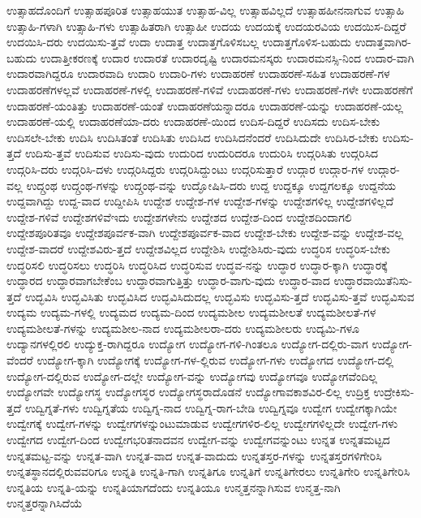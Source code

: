 {ಉತ್ಸಾಹದೊಂದಿಗೆ
ಉತ್ಸಾಹಪೂರಿತ
ಉತ್ಸಾಹಯುತ
ಉತ್ಸಾಹ-ವಿಲ್ಲ
ಉತ್ಸಾಹವಿಲ್ಲದೆ
ಉತ್ಸಾಹಹೀನನಾಗುವ
ಉತ್ಸಾಹಿ
ಉತ್ಸಾಹಿ-ಗಳಾಗಿ
ಉತ್ಸಾಹಿ-ಗಳು
ಉತ್ಸಾಹಿತರಾಗಿ
ಉತ್ಸಾಹೀ
ಉದಯ
ಉದಯಕ್ಕೆ
ಉದಯರವಿಯ
ಉದಯಿಸ-ದಿದ್ದರೆ
ಉದಯಿಸಿ-ದರು
ಉದಯಿಸು-ತ್ತವೆ
ಉದಾ
ಉದಾತ್ತ
ಉದಾತ್ತಗೊಳಿಸಬಲ್ಲ
ಉದಾತ್ತಗೊಳಿಸ-ಬಹುದು
ಉದಾತ್ತವಾಗಿರ-ಬಹುದು
ಉದಾತ್ತೀಕರಣಕ್ಕೆ
ಉದಾರ
ಉದಾರತೆ
ಉದಾರದೃಷ್ಟಿ
ಉದಾರಮನಸ್ಕರು
ಉದಾರಮನಸ್ಸಿ-ನಿಂದ
ಉದಾರ-ವಾಗಿ
ಉದಾರವಾಗಿದ್ದರೂ
ಉದಾರವಾದಿ
ಉದಾರಿ
ಉದಾರಿ-ಗಳು
ಉದಾಹರಣೆ
ಉದಾಹರಣೆ-ಸಹಿತ
ಉದಾಹರಣೆ-ಗಳ
ಉದಾಹರಣೆಗಳಲ್ಲವೆ
ಉದಾಹರಣೆ-ಗಳಲ್ಲಿ
ಉದಾಹರಣೆ-ಗಳಿವೆ
ಉದಾಹರಣೆ-ಗಳು
ಉದಾಹರಣೆ-ಗಳೇ
ಉದಾಹರಣೆಗೆ
ಉದಾಹರಣೆ-ಯಂತಿತ್ತು
ಉದಾಹರಣೆ-ಯಂತೆ
ಉದಾಹರಣೆಯನ್ನಾದರೂ
ಉದಾಹರಣೆ-ಯನ್ನು
ಉದಾಹರಣೆ-ಯಲ್ಲ
ಉದಾಹರಣೆ-ಯಲ್ಲಿ
ಉದಾಹರಣೆಯಾ-ದರು
ಉದಾಹರಣೆ-ಯಿಂದ
ಉದಿಸ-ದಿದ್ದರೆ
ಉದಿಸದು
ಉದಿಸ-ಬೇಕು
ಉದಿಸಲೇ-ಬೇಕು
ಉದಿಸಿ
ಉದಿಸಿತಂತೆ
ಉದಿಸಿತು
ಉದಿಸಿದ
ಉದಿಸಿದನೆಂದರೆ
ಉದಿಸಿದುದೇ
ಉದಿಸಿರ-ಬೇಕು
ಉದಿಸು-ತ್ತದೆ
ಉದಿಸು-ತ್ತವೆ
ಉದಿಸುವ
ಉದಿಸು-ವುದು
ಉದುರಿದ
ಉದುರಿದರೂ
ಉದುರಿಸಿ
ಉದ್ಗರಿಸಿತು
ಉದ್ಗರಿಸಿದ
ಉದ್ಗರಿಸಿ-ದರು
ಉದ್ಗರಿಸಿ-ದಳು
ಉದ್ಗರಿಸಿದ್ದರು
ಉದ್ಗರಿಸಿದ್ದುಂಟು
ಉದ್ಗರಿಸುತ್ತಾರೆ
ಉದ್ಗಾರ
ಉದ್ಗಾರ-ಗಳ
ಉದ್ಗಾರ-ವಲ್ಲ
ಉದ್ಗ್ರಂಥ
ಉದ್ಗ್ರಂಥ-ಗಳನ್ನು
ಉದ್ಗ್ರಂಥ-ವನ್ನು
ಉದ್ಘೋಷಿಸಿ-ದರು
ಉದ್ದ
ಉದ್ದಕ್ಕೂ
ಉದ್ದಗಲಕ್ಕೂ
ಉದ್ದನೆಯ
ಉದ್ದವಾಗಿದ್ದು
ಉದ್ದ-ವಾದ
ಉದ್ದೀಪಿಸಿ
ಉದ್ದೇಶ
ಉದ್ದೇಶ-ಗಳ
ಉದ್ದೇಶ-ಗಳನ್ನು
ಉದ್ದೇಶಗಳಿಲ್ಲ
ಉದ್ದೇಶಗಳಿಲ್ಲದೆ
ಉದ್ದೇಶ-ಗಳಿವೆ
ಉದ್ದೇಶಗಳಿವೆಇದು
ಉದ್ದೇಶಗಳೇನು
ಉದ್ದೇಶದ
ಉದ್ದೇಶ-ದಿಂದ
ಉದ್ದೇಶದಿಂದಾಗಲಿ
ಉದ್ದೇಶಪೂರಿತವೂ
ಉದ್ದೇಶಪೂರ್ವಕ-ವಾಗಿ
ಉದ್ದೇಶಪೂರ್ವಕ-ವಾದ
ಉದ್ದೇಶ-ಬೇಕು
ಉದ್ದೇಶ-ವನ್ನು
ಉದ್ದೇಶ-ವಲ್ಲ
ಉದ್ದೇಶ-ವಾದರೆ
ಉದ್ದೇಶವಿರು-ತ್ತದೆ
ಉದ್ದೇಶವಿಲ್ಲದ
ಉದ್ದೇಶಿಸಿ
ಉದ್ದೇಶಿಸಿರು-ವುದು
ಉದ್ಧರಿಸ
ಉದ್ಧರಿಸ-ಬೇಕು
ಉದ್ಧರಿಸಲಿ
ಉದ್ಧರಿಸಲು
ಉದ್ಧರಿಸಿ
ಉದ್ಧರಿಸಿದ
ಉದ್ಧರಿಸುವ
ಉದ್ಧವ-ನನ್ನು
ಉದ್ಧಾರ
ಉದ್ಧಾರ-ಕ್ಕಾಗಿ
ಉದ್ಧಾರಕ್ಕೆ
ಉದ್ಧಾರದ
ಉದ್ಧಾರವಾಗಬೇಕೆಂಬ
ಉದ್ಧಾರವಾಗುತ್ತಿತ್ತು
ಉದ್ಧಾರ-ವಾಗು-ವುದು
ಉದ್ಧಾರ-ವಾದ
ಉದ್ಧಾರವಾಯಿತೆನಿಸು-ತ್ತದೆ
ಉದ್ಭವಿಸಿ
ಉದ್ಭವಿಸಿತು
ಉದ್ಭವಿಸಿದ
ಉದ್ಭವಿಸಿದುದಲ್ಲ
ಉದ್ಭವಿಸು
ಉದ್ಭವಿಸು-ತ್ತದೆ
ಉದ್ಭವಿಸು-ತ್ತವೆ
ಉದ್ಭವಿಸುವ
ಉದ್ಯಮ
ಉದ್ಯಮ-ಗಳಲ್ಲಿ
ಉದ್ಯಮದ
ಉದ್ಯಮ-ದಿಂದ
ಉದ್ಯಮಶೀಲ
ಉದ್ಯಮಶೀಲತೆ
ಉದ್ಯಮಶೀಲತೆ-ಗಳ
ಉದ್ಯಮಶೀಲತೆ-ಗಳನ್ನು
ಉದ್ಯಮಶೀಲ-ನಾದ
ಉದ್ಯಮಶೀಲರಾ-ದರು
ಉದ್ಯಮಶೀಲರು
ಉದ್ಯಮಿ-ಗಳೂ
ಉದ್ಯಾನಗಳಲ್ಲಿರಲಿ
ಉದ್ಯುಕ್ತ-ರಾಗಿದ್ದರೂ
ಉದ್ಯೋಗ
ಉದ್ಯೋಗ-ಗಳಿ-ಗಿಂತಲೂ
ಉದ್ಯೋಗ-ದಲ್ಲಿರು-ವಾಗ
ಉದ್ಯೋಗ-ವೆಂದರೆ
ಉದ್ಯೋಗ-ಕ್ಕಾಗಿ
ಉದ್ಯೋಗಕ್ಕೆ
ಉದ್ಯೋಗ-ಗಳ-ಲ್ಲಿರುವ
ಉದ್ಯೋಗ-ಗಳು
ಉದ್ಯೋಗದ
ಉದ್ಯೋಗ-ದಲ್ಲಿ
ಉದ್ಯೋಗ-ದಲ್ಲಿರುವ
ಉದ್ಯೋಗ-ದಲ್ಲೇ
ಉದ್ಯೋಗ-ವನ್ನು
ಉದ್ಯೋಗವು
ಉದ್ಯೋಗವೂ
ಉದ್ಯೋಗವೆಂದಿಲ್ಲ
ಉದ್ಯೋಗವೇ
ಉದ್ಯೋಗಸ್ಥ
ಉದ್ಯೋಗಸ್ಥರ
ಉದ್ಯೋಗಸ್ಥರಾದೊಡನೆ
ಉದ್ಯೋಗಾವಕಾಶವಿರ-ಲಿಲ್ಲ
ಉದ್ರಿಕ್ತ
ಉದ್ರೇಕಿಸು-ತ್ತದೆ
ಉದ್ವಿಗ್ನತೆ-ಗಳು
ಉದ್ವಿಗ್ನತೆಯ
ಉದ್ವಿಗ್ನ-ನಾದ
ಉದ್ವಿಗ್ನ-ರಾಗ-ಬೇಡಿ
ಉದ್ವಿಗ್ನವೂ
ಉದ್ವೇಗ
ಉದ್ವೇಗಕ್ಕಾಗಿಯೇ
ಉದ್ವೇಗಕ್ಕೆ
ಉದ್ವೇಗ-ಗಳನ್ನು
ಉದ್ವೇಗಗಳನ್ನುಂಟುಮಾಡುವ
ಉದ್ವೇಗಗಳಿರ-ಲಿಲ್ಲ
ಉದ್ವೇಗಗಳಿಲ್ಲದೇ
ಉದ್ವೇಗ-ಗಳು
ಉದ್ವೇಗದ
ಉದ್ವೇಗ-ದಿಂದ
ಉದ್ವೇಗಭರಿತನಾದವನ
ಉದ್ವೇಗ-ವನ್ನು
ಉದ್ವೇಗವನ್ನುಂಟು
ಉನ್ನತ
ಉನ್ನತಮಟ್ಟದ
ಉನ್ನತಮಟ್ಟ-ವನ್ನು
ಉನ್ನತ-ವಾಗಿ
ಉನ್ನತ-ವಾದ
ಉನ್ನತ-ವಾದುದು
ಉನ್ನತಸ್ತರ-ಗಳನ್ನು
ಉನ್ನತಸ್ತರಗಳಿಗೇರಿಸಿ
ಉನ್ನತಸ್ಥಾನದಲ್ಲಿರುವವರಿಗೂ
ಉನ್ನತಿ
ಉನ್ನತಿ-ಗಾಗಿ
ಉನ್ನತಿಗೂ
ಉನ್ನತಿಗೆ
ಉನ್ನತಿಗೇರಲು
ಉನ್ನತಿಗೇರಿ
ಉನ್ನತಿಗೇರಿಸಿ
ಉನ್ನತಿಯ
ಉನ್ನತಿ-ಯನ್ನು
ಉನ್ನತಿಯಾಗದೆಂದು
ಉನ್ನತಿಯೂ
ಉನ್ಮತ್ತನನ್ನಾಗಿಸುವ
ಉನ್ಮತ್ತ-ನಾಗಿ
ಉನ್ಮತ್ತರನ್ನಾಗಿಸಿದೆಯೆ
}

